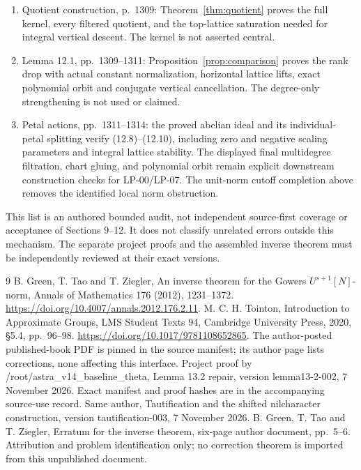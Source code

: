 \documentclass[11pt]{article}
\begin{document}
\begin{enumerate}
and independent petals requires relabelling every associated index, not
changing which generators are annihilated.
\item Quotient construction, p.~1309: Theorem~\ref{thm:quotient} proves
the full kernel, every filtered quotient, and the top-lattice saturation
needed for integral vertical descent. The kernel is not asserted central.
\item Lemma 12.1, pp.~1309--1311: Proposition~\ref{prop:comparison}
proves the rank drop with actual constant normalization, horizontal lattice
lifts, exact polynomial orbit and conjugate vertical cancellation.
The degree-only strengthening is not used or claimed.
\item Petal actions, pp.~1311--1314: the proved abelian ideal and its
individual-petal splitting verify (12.8)--(12.10), including zero and
negative scaling parameters and integral lattice stability. The displayed
final multidegree filtration, chart gluing, and polynomial orbit remain
explicit downstream construction checks for LP-00/LP-07. The unit-norm
cutoff completion above removes the identified local norm obstruction.
\end{enumerate}
This list is an authored bounded audit, not independent source-first coverage
or acceptance of Sections 9--12. It does not classify unrelated errors outside
this mechanism. The separate project proofs and the assembled inverse theorem
must be independently reviewed at their exact versions.

\begin{thebibliography}{9}
 B. Green, T. Tao and T. Ziegler,
An inverse theorem for the Gowers $U^{s+1}[N]$-norm,
Annals of Mathematics 176 (2012), 1231--1372.
\url{https://doi.org/10.4007/annals.2012.176.2.11}.
 M. C. H. Tointon,
Introduction to Approximate Groups, LMS Student Texts 94,
Cambridge University Press, 2020, \S5.4, pp.~96--98.
\url{https://doi.org/10.1017/9781108652865}.
The author-posted published-book PDF is pinned in the source manifest;
its author page lists corrections, none affecting this interface.
 Project proof by /root/astra\_v14\_baseline\_theta,
Lemma 13.2 repair, version lemma13-2-002, 7 November 2026.
Exact manifest and proof hashes are in the accompanying source-use record.
 Same author, Tautification and the shifted nilcharacter
construction, version tautification-003, 7 November 2026.
 B. Green, T. Tao and T. Ziegler,
Erratum for the inverse theorem, six-page author document,
pp.~5--6. Attribution and problem identification only; no correction theorem
is imported from this unpublished document.
\end{thebibliography}
\end{document}

